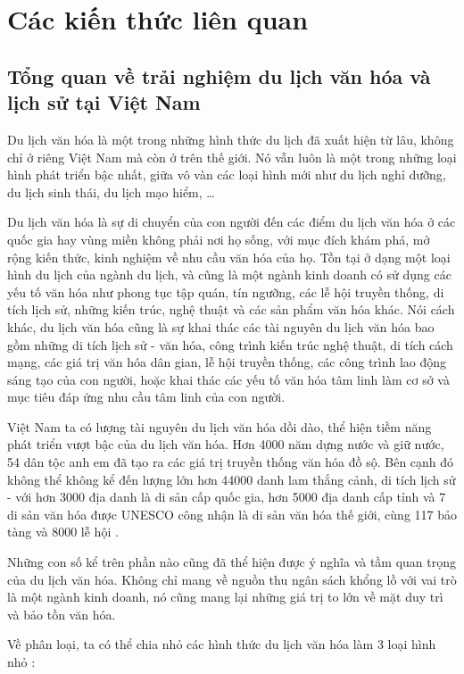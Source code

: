 \chapter{Các kiến thức liên quan}

\section{Tổng quan về trải nghiệm du lịch văn hóa và lịch sử tại Việt Nam}
Du lịch văn hóa là một trong những hình thức du lịch đã xuất hiện từ lâu, không
chỉ ở riêng Việt Nam mà còn ở trên thế giới. Nó vẫn luôn là một trong những loại
hình phát triển bậc nhất, giữa vô vàn các loại hình mới như du lịch nghỉ dưỡng, du
lịch sinh thái, du lịch mạo hiểm, …

Du lịch văn hóa là sự di chuyển của con người đến các điểm du lịch văn hóa ở
các quốc gia hay vùng miền không phải nơi họ sống, với mục đích khám phá, mở
rộng kiến thức, kinh nghiệm về nhu cầu văn hóa của họ. Tồn tại ở dạng một loại hình
du lịch của ngành du lịch, và cũng là một ngành kinh doanh có sử dụng các yếu tố
văn hóa như phong tục tập quán, tín ngưỡng, các lễ hội truyền thống, di tích lịch sử,
những kiến trúc, nghệ thuật và các sản phẩm văn hóa khác. Nói cách khác, du lịch
văn hóa cũng là sự khai thác các tài nguyên du lịch văn hóa bao gồm những di tích
lịch sử - văn hóa, công trình kiến trúc nghệ thuật, di tích cách mạng, các giá trị văn
hóa dân gian, lễ hội truyền thống, các công trình lao động sáng tạo của con người,
hoặc khai thác các yếu tố văn hóa tâm linh làm cơ sở và mục tiêu đáp ứng nhu cầu
tâm linh của con người.

Việt Nam ta có lượng tài nguyên du lịch văn hóa dồi dào, thể hiện tiềm năng
phát triển vượt bậc của du lịch văn hóa. Hơn 4000 năm dựng nước và giữ nước, 54
dân tộc anh em đã tạo ra các giá trị truyền thống văn hóa đồ sộ. Bên cạnh đó không
thể không kể đến lượng lớn hơn 44000 danh lam thắng cảnh, di tích lịch sử - với hơn
3000 địa danh là di sản cấp quốc gia, hơn 5000 địa danh cấp tỉnh và 7 di sản văn hóa
được UNESCO công nhận là di sản văn hóa thế giới, cùng 117 bảo tàng và 8000 lễ
hội \cite{huong2022}.

Những con số kể trên phần nào cũng đã thể hiện được ý nghĩa và tầm quan trọng
của du lịch văn hóa. Không chỉ mang về nguồn thu ngân sách khổng lồ với vai trò là
một ngành kinh doanh, nó cũng mang lại những giá trị to lớn về mặt duy trì và bảo
tồn văn hóa.

Về phân loại, ta có thể chia nhỏ các hình thức du lịch văn hóa làm 3 loại hình
nhỏ \cite{vinpearl2022}: